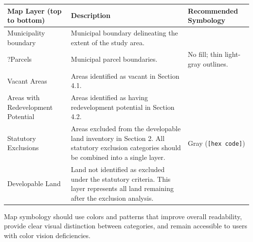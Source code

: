\documentclass[
  letterpaper,
  DIV=11,
  numbers=noendperiod]{scrreprt}
\newcounter{none} %
\begin{document}
{\def\LTcaptype{none} %
\begin{longtable}[]{@{}
  >{\raggedright\arraybackslash}p{}
  >{\raggedright\arraybackslash}p{}
  >{\raggedright\arraybackslash}p{}@{}}
\toprule\noalign{}
\begin{minipage}[b]{\linewidth}\raggedright
Map Layer (top to bottom)
\end{minipage} & \begin{minipage}[b]{\linewidth}\raggedright
Description
\end{minipage} & \begin{minipage}[b]{\linewidth}\raggedright
Recommended Symbology
\end{minipage} \\
\midrule\noalign{}
\endhead
\bottomrule\noalign{}
\endlastfoot
Municipality boundary & Municipal boundary delineating the extent of the
study area. & \\
?Parcels & Municipal parcel boundaries. & No fill; thin light-gray
outlines. \\
Vacant Areas & Areas identified as vacant in Section 4.1. & \\
Areas with Redevelopment Potential & Areas identified as having
redevelopment potential in Section 4.2. & \\
Statutory Exclusions & Areas excluded from the developable land
inventory in Section 2. All statutory exclusion categories should be
combined into a single layer. & Gray (\texttt{{[}hex\ code{]}}) \\
Developable Land & Land not identified as excluded under the statutory
criteria. This layer represents all land remaining after the exclusion
analysis. & \\
\end{longtable}
}

\begin{tcolorbox}[enhanced jigsaw, arc=.35mm, bottomrule=.15mm, breakable, colback=white, colframe=quarto-callout-caution-color-frame, left=2mm, leftrule=.75mm, opacityback=0, rightrule=.15mm, toprule=.15mm]

Map symbology should use colors and patterns that improve overall
readability, provide clear visual distinction between categories, and
remain accessible to users with color vision deficiencies.

\end{tcolorbox}
\end{document}
